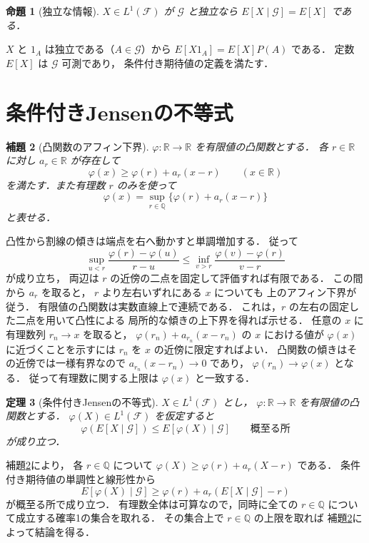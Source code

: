 \documentclass[a5paper,10pt,onecolumn]{jsarticle}
\makeatletter
\theoremstyle{mathnotetheorem}
\newtheorem{theorem}{定理}[section]
\newtheorem{lemma}[theorem]{補題}
\newtheorem{proposition}[theorem]{命題}
\renewcommand{\proofname}{証明}
\renewenvironment{proof}[1][\proofname]{%
  \par\pushQED{\qed}\normalfont\topsep4\p@\@plus2\p@\relax
  \trivlist\item[\hskip\labelsep\bfseries #1]\ignorespaces
}{\popQED\endtrivlist\@endpefalse}
\makeatother
\begin{document}
\begin{proposition}[独立な情報]\label{prop:independent}
$X\in L^1(\mathcal F)$ が $\mathcal G$ と独立なら
$E[X\mid\mathcal G]=E[X]$ である．
\end{proposition}
\begin{proof}
$X$ と $1_A$ は独立である（$A\in\mathcal G$）から
$E[X1_A]=E[X]P(A)$ である．
定数 $E[X]$ は $\mathcal G$ 可測であり，
条件付き期待値の定義を満たす．
\end{proof}

\section{条件付きJensenの不等式}

\begin{lemma}[凸関数のアフィン下界]\label{lem:convex-support}
$\varphi:\mathbb R\to\mathbb R$ を有限値の凸関数とする．
各 $r\in\mathbb R$ に対し
$a_r\in\mathbb R$ が存在して
\[
 \varphi(x)\ge\varphi(r)+a_r(x-r)
 \qquad(x\in\mathbb R)
\]
を満たす．また有理数 $r$ のみを使って
\[
 \varphi(x)=\sup_{r\in\mathbb Q}
 \{\varphi(r)+a_r(x-r)\}
\]
と表せる．
\end{lemma}
\begin{proof}
凸性から割線の傾きは端点を右へ動かすと単調増加する．
従って
\[
 \sup_{u<r}\frac{\varphi(r)-\varphi(u)}{r-u}
 \le
 \inf_{v>r}\frac{\varphi(v)-\varphi(r)}{v-r}
\]
が成り立ち，
両辺は $r$ の近傍の二点を固定して評価すれば有限である．
この間から $a_r$ を取ると，
$r$ より左右いずれにある $x$ についても
上のアフィン下界が従う．
有限値の凸関数は実数直線上で連続である．
これは，$r$ の左右の固定した二点を用いて凸性による
局所的な傾きの上下界を得れば示せる．
任意の $x$ に有理数列 $r_n\to x$ を取ると，
$\varphi(r_n)+a_{r_n}(x-r_n)$ の
$x$ における値が $\varphi(x)$ に近づくことを示すには
$r_n$ を $x$ の近傍に限定すればよい．
凸関数の傾きはその近傍では一様有界なので
$a_{r_n}(x-r_n)\to0$ であり，
$\varphi(r_n)\to\varphi(x)$ となる．
従って有理数に関する上限は $\varphi(x)$ と一致する．
\end{proof}

\begin{theorem}[条件付きJensenの不等式]\label{thm:jensen}
$X\in L^1(\mathcal F)$ とし，
$\varphi:\mathbb R\to\mathbb R$ を有限値の凸関数とする．
$\varphi(X)\in L^1(\mathcal F)$ を仮定すると
\[
 \varphi(E[X\mid\mathcal G])
 \le E[\varphi(X)\mid\mathcal G]
 \qquad\text{概至る所}
\]
が成り立つ．
\end{theorem}
\begin{proof}
補題\ref{lem:convex-support}により，
各 $r\in\mathbb Q$ について
$\varphi(X)\ge\varphi(r)+a_r(X-r)$ である．
条件付き期待値の単調性と線形性から
\[
 E[\varphi(X)\mid\mathcal G]
 \ge\varphi(r)+a_r(E[X\mid\mathcal G]-r)
\]
が概至る所で成り立つ．
有理数全体は可算なので，同時に全ての $r\in\mathbb Q$
について成立する確率1の集合を取れる．
その集合上で $r\in\mathbb Q$ の上限を取れば
補題\ref{lem:convex-support}によって結論を得る．
\end{proof}
\end{document}
